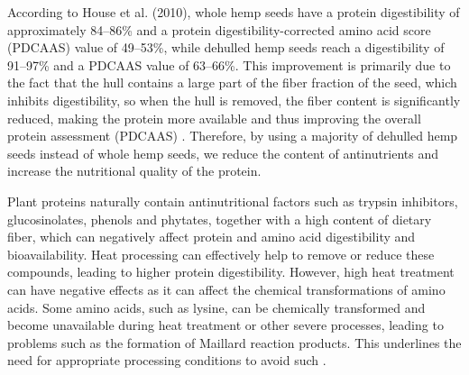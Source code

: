 \vspace{1em}
According to House et al. (2010), whole hemp seeds have a protein digestibility of approximately 84–86\% and a protein digestibility-corrected amino acid score (PDCAAS) value of 49–53\%, while dehulled hemp seeds reach a digestibility of 91–97\% and a PDCAAS value of 63–66\%. This improvement is primarily due to the fact that the hull contains a large part of the fiber fraction of the seed, which inhibits digestibility, so when the hull is removed, the fiber content is significantly reduced, making the protein more available and thus improving the overall protein assessment (PDCAAS) \cite*{house2010evaluating}. Therefore, by using a majority of dehulled hemp seeds instead of whole hemp seeds, we reduce the content of antinutrients and increase the nutritional quality of the protein.

\vspace{1em}
Plant proteins naturally contain antinutritional factors such as trypsin inhibitors, glucosinolates, phenols and phytates, together with a high content of dietary fiber, which can negatively affect protein and amino acid digestibility and bioavailability. Heat processing can effectively help to remove or reduce these compounds, leading to higher protein digestibility. However, high heat treatment can have negative effects as it can affect the chemical transformations of amino acids. Some amino acids, such as lysine, can be chemically transformed and become unavailable during heat treatment or other severe processes, leading to problems such as the formation of Maillard reaction products. This underlines the need for appropriate processing conditions to avoid such \cite*{FAO2013DietaryProteinQuality}.


